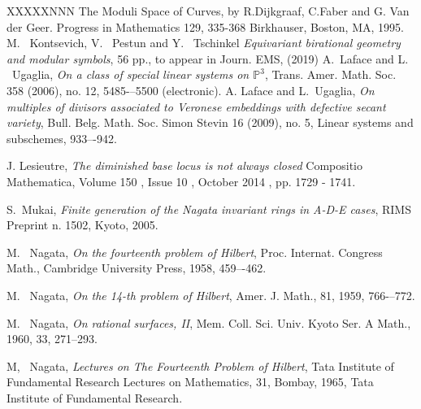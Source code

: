 \documentclass[12pt]{article}
\numberwithin{equation}{section}
\numberwithin{subeq}{equation}
\begin{document}
\begin{thebibliography}{XXXXXNNN}
The Moduli Space of Curves, by R.Dijkgraaf, C.Faber and G. Van der Geer. Progress in Mathematics 129, 335-368  Birkhauser, Boston, MA, 1995.
 M. ~Kontsevich,  V.~ Pestun and Y.~ Tschinkel
{\it Equivariant birational geometry and modular symbols}, 56 pp., to appear in Journ. EMS, (2019)
A.~Laface and L. ~Ugaglia, {\it On a class of special linear systems on $\mathbb{P}^3$}, Trans. Amer. Math. Soc. 358 (2006), no. 12, 5485-–5500 (electronic).
A. Laface and L.~Ugaglia, {\it On multiples of divisors associated to Veronese embeddings with
defective secant variety}, Bull. Belg. Math. Soc. Simon Stevin 16 (2009), no. 5, Linear systems
and subschemes, 933–-942.

 J. Lesieutre,
{\it The diminished base locus is not always closed} Compositio Mathematica, Volume 150 , Issue 10 , October 2014 , pp. 1729 - 1741.

S.~Mukai,
{\it Finite generation of the Nagata invariant rings in A-D-E cases}, RIMS Preprint n. 1502, Kyoto, 2005.

M. ~Nagata, {\it On the fourteenth problem of Hilbert}, Proc. Internat. Congress Math.,
 Cambridge University Press, 1958,  459–-462.

M. ~Nagata, {\it On the 14-th problem of Hilbert}, Amer. J. Math., 81, 1959, 766-–772.

M. ~Nagata, {\it On rational surfaces, II}, Mem. Coll. Sci. Univ. Kyoto Ser. A Math., 1960, 33, 271--293.

M,~ Nagata, {\it Lectures on The Fourteenth Problem of Hilbert}, Tata Institute of Fundamental Research Lectures on Mathematics, 31, Bombay, 1965, Tata Institute of Fundamental Research.

\end{thebibliography}
\end{document}
